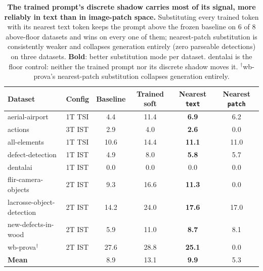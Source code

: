 \documentclass{article}
\newcommand{\best}[1]{\textbf{#1}}
\begin{document}
\begin{table}[h]
  \centering
  \caption{\textbf{The trained prompt's discrete shadow carries most of its signal, more reliably in text than in image-patch space.}
    Substituting every trained token with its nearest text token keeps the prompt above the frozen baseline on 6 of 8 above-floor datasets and wins on every one of them; nearest-patch substitution is consistently weaker and collapses generation entirely (zero parseable detections) on three datasets.
    \best{Bold}: better substitution mode per dataset.
    dentalai is the floor control: neither the trained prompt nor its discrete shadow moves it.
    $^{\dagger}$wb-prova's nearest-patch substitution collapses generation entirely.}
  \label{tab:substitution}
  \small
  \setlength{\tabcolsep}{5pt}
  \begin{tabular}{llcccc}
    \toprule
    Dataset & Config & Baseline & Trained soft & Nearest \texttt{text} & Nearest \texttt{patch} \\
    \midrule
    aerial-airport            & 1T TSI &  4.4 & 11.4 & \best{6.9}  & 6.2 \\
    actions                   & 3T IST &  2.9 &  4.0 & \best{2.6}  & 0.0 \\
    all-elements              & 1T TSI & 10.6 & 14.4 & \best{11.1} & 11.0 \\
    defect-detection          & 1T IST &  4.9 &  8.0 & \best{5.8}  & 5.7 \\
    dentalai                  & 1T IST &  0.0 &  0.0 & 0.0         & 0.0 \\
    flir-camera-objects       & 2T IST &  9.3 & 16.6 & \best{11.3} & 0.0 \\
    lacrosse-object-detection & 2T IST & 14.2 & 24.0 & \best{17.6} & 17.0 \\
    new-defects-in-wood       & 2T IST &  5.9 & 11.0 & \best{8.7}  & 8.1 \\
    wb-prova$^{\dagger}$      & 2T IST & 27.6 & 28.8 & \best{25.1} & 0.0 \\
    \midrule
    \textbf{Mean}             &        &  8.9 & 13.1 & \best{9.9}  & 5.3 \\
    \bottomrule
  \end{tabular}
\end{table}
\end{document}
